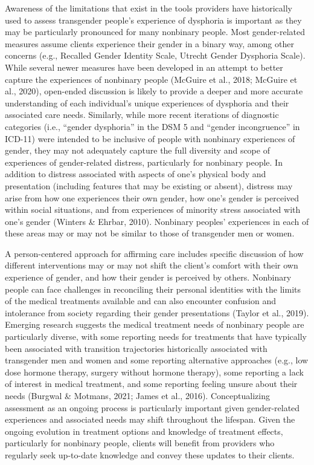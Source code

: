 \documentclass[
]{book}
\begin{document}
Awareness of the limitations that exist in the
tools providers have historically used to assess
transgender people's experience of dysphoria is
important as they may be particularly pronounced
for many nonbinary people. Most gender-related
measures assume clients experience their gender
in a binary way, among other concerns (e.g.,
Recalled Gender Identity Scale, Utrecht Gender
Dysphoria Scale). While several newer measures
have been developed in an attempt to better capture the experiences of nonbinary people (McGuire
et al., 2018; McGuire et al., 2020), open-ended
discussion is likely to provide a deeper and more
accurate understanding of each individual's unique
experiences of dysphoria and their associated care
needs. Similarly, while more recent iterations of
diagnostic categories (i.e., ``gender dysphoria'' in
the DSM 5 and ``gender incongruence'' in ICD-11)
were intended to be inclusive of people with nonbinary experiences of gender, they may not adequately capture the full diversity and scope of
experiences of gender-related distress, particularly
for nonbinary people. In addition to distress associated with aspects of one's physical body and
presentation (including features that may be existing or absent), distress may arise from how one
experiences their own gender, how one's gender
is perceived within social situations, and from
experiences of minority stress associated with one's
gender (Winters \& Ehrbar, 2010). Nonbinary peoples' experiences in each of these areas may or
may not be similar to those of transgender men
or women.

A person-centered approach for affirming care
includes specific discussion of how different
interventions may or may not shift the client's
comfort with their own experience of gender, and
how their gender is perceived by others.
Nonbinary people can face challenges in reconciling their personal identities with the limits of
the medical treatments available and can also
encounter confusion and intolerance from society
regarding their gender presentations (Taylor et al.,
2019). Emerging research suggests the medical
treatment needs of nonbinary people are particularly diverse, with some reporting needs for
treatments that have typically been associated
with transition trajectories historically associated
with transgender men and women and some
reporting alternative approaches (e.g., low dose
hormone therapy, surgery without hormone therapy), some reporting a lack of interest in medical
treatment, and some reporting feeling unsure
about their needs (Burgwal \& Motmans, 2021;
James et al., 2016). Conceptualizing assessment
as an ongoing process is particularly important
given gender-related experiences and associated
needs may shift throughout the lifespan. Given
the ongoing evolution in treatment options and
knowledge of treatment effects, particularly for
nonbinary people, clients will benefit from providers who regularly seek up-to-date knowledge
and convey these updates to their clients.
\end{document}
